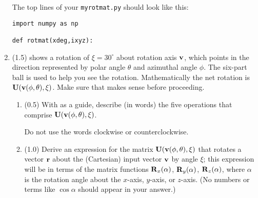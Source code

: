 \documentclass[11pt,titlepage,fleqn]{article}
\newcommand{\rotangA}{\alpha}
\newcommand{\rotangB}{\xi}    %
\newcommand{\rotvec}{\bv}      %
\begin{document}
\begin{enumerate}
The top lines of your \verb+myrotmat.py+ should look like this:
%
\begin{verbatim}
import numpy as np

def rotmat(xdeg,ixyz):
\end{verbatim}

\item (1.5)  shows a rotation of $\rotangB = 30^\circ$ about rotation axis $\rotvec$, which points in the direction represented by polar angle $\theta$ and azimuthal angle $\phi$. The six-part ball is used to help you see the rotation. Mathematically the net rotation is $\bU(\rotvec(\phi,\theta),\rotangB)$. Make sure that  makes sense before proceeding.
%
\begin{enumerate}
\item (0.5) With  as a guide, describe (in words) the five operations that comprise $\bU(\rotvec(\phi,\theta),\rotangB)$.

Do not use the words clockwise or counterclockwise.

\item (1.0) Derive an expression for the matrix $\bU(\rotvec(\phi,\theta),\rotangB)$ that rotates a vector $\mbox{${\bf r}$}$ about the (Cartesian) input vector $\rotvec$ by angle $\rotangB$; this expression will be in terms of the matrix functions $\bR_x(\rotangA)$, $\bR_y(\rotangA)$, $\bR_z(\rotangA)$, where $\rotangA$ is the rotation angle about the $x$-axis, $y$-axis, or $z$-axis. (No numbers or terms like $\cos\rotangA$ should appear in your answer.)

\end{enumerate}


\end{enumerate}
\end{document}
